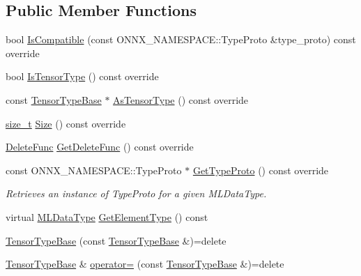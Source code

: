 \subsection*{Public Member Functions}
\begin{DoxyCompactItemize}
\item 
bool \mbox{\hyperlink{classonnxruntime_1_1TensorTypeBase_a24c6755da5656503337ec14e9a4ebbf8}{Is\+Compatible}} (const O\+N\+N\+X\+\_\+\+N\+A\+M\+E\+S\+P\+A\+C\+E\+::\+Type\+Proto \&type\+\_\+proto) const override
\item 
bool \mbox{\hyperlink{classonnxruntime_1_1TensorTypeBase_aca50ccc834e19c0e5e8bf15ecdaa7711}{Is\+Tensor\+Type}} () const override
\item 
const \mbox{\hyperlink{classonnxruntime_1_1TensorTypeBase}{Tensor\+Type\+Base}} $\ast$ \mbox{\hyperlink{classonnxruntime_1_1TensorTypeBase_aeadb9994879864d4bd1fcc8413d2545d}{As\+Tensor\+Type}} () const override
\item 
\mbox{\hyperlink{mlasi_8h_a503efbc1c6e50825320ad909366b78ab}{size\+\_\+t}} \mbox{\hyperlink{classonnxruntime_1_1TensorTypeBase_a1455fddb91004f40b6d060af404779e0}{Size}} () const override
\item 
\mbox{\hyperlink{namespaceonnxruntime_a8dcea0e1aa8476e3d09d5a44a0ca4516}{Delete\+Func}} \mbox{\hyperlink{classonnxruntime_1_1TensorTypeBase_a15a08f55ee78063dd91503a3db044171}{Get\+Delete\+Func}} () const override
\item 
const O\+N\+N\+X\+\_\+\+N\+A\+M\+E\+S\+P\+A\+C\+E\+::\+Type\+Proto $\ast$ \mbox{\hyperlink{classonnxruntime_1_1TensorTypeBase_a1689311da54ea3be4752cbf7dfa6054e}{Get\+Type\+Proto}} () const override
\begin{DoxyCompactList}\small\item\em Retrieves an instance of Type\+Proto for a given M\+L\+Data\+Type. \end{DoxyCompactList}\item 
virtual \mbox{\hyperlink{namespaceonnxruntime_ad77d0a6e838ec7da5dc35fed5ee66b49}{M\+L\+Data\+Type}} \mbox{\hyperlink{classonnxruntime_1_1TensorTypeBase_a4f3b2fcd0cd32a16607ef39bae0111af}{Get\+Element\+Type}} () const
\item 
\mbox{\hyperlink{classonnxruntime_1_1TensorTypeBase_a95f507377479db2346f591e3df63ba8b}{Tensor\+Type\+Base}} (const \mbox{\hyperlink{classonnxruntime_1_1TensorTypeBase}{Tensor\+Type\+Base}} \&)=delete
\item 
\mbox{\hyperlink{classonnxruntime_1_1TensorTypeBase}{Tensor\+Type\+Base}} \& \mbox{\hyperlink{classonnxruntime_1_1TensorTypeBase_a7e92e65796abb3a8cb4722b2abac475a}{operator=}} (const \mbox{\hyperlink{classonnxruntime_1_1TensorTypeBase}{Tensor\+Type\+Base}} \&)=delete
\end{DoxyCompactItemize}
